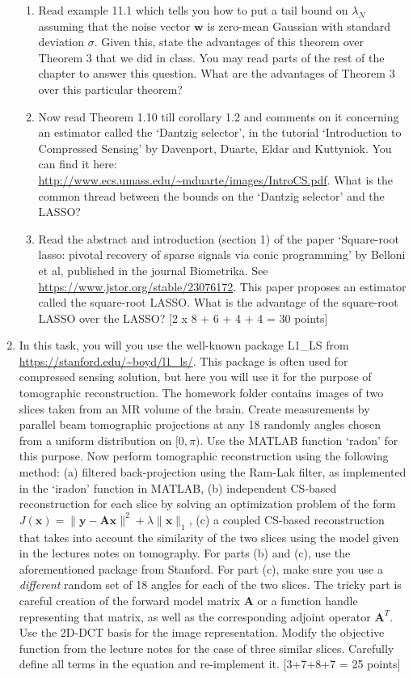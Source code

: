 \documentclass[11pt]{article}
\begin{document}
\begin{enumerate}
\begin{enumerate}
\item Read example 11.1 which tells you how to put a tail bound on $\lambda_N$ assuming that the noise vector $\boldsymbol{w}$ is zero-mean Gaussian with standard  deviation $\sigma$. Given this, state the advantages of this theorem over Theorem 3 that we did in class. You may read parts of the rest of the chapter to answer this question. What are the advantages of Theorem 3 over this particular theorem? 
\item Now read Theorem 1.10 till corollary 1.2 and comments on it concerning an estimator called the `Dantzig selector', in the tutorial `Introduction to Compressed Sensing' by Davenport, Duarte, Eldar and Kuttyniok. You can find it here: \url{http://www.ecs.umass.edu/~mduarte/images/IntroCS.pdf}. What is the common thread between the bounds on the `Dantzig selector' and the LASSO? 
\item Read the abstract and introduction (section 1) of the paper `Square-root lasso: pivotal recovery of sparse signals via conic programming' by Belloni et al, published in the journal Biometrika. See \url{https://www.jstor.org/stable/23076172}. This paper proposes an estimator called the square-root LASSO. What is the advantage of the square-root LASSO over the LASSO?
\textsf{[2 x 8 + 6 + 4 + 4 = 30 points]}
\end{enumerate}

\item In this task, you will you use the well-known package L1\_LS from \url{https://stanford.edu/~boyd/l1_ls/}. This package is often used for compressed sensing solution, but here you will use it for the purpose of tomographic reconstruction. The homework folder contains images of two slices taken from an MR volume of the brain. Create measurements by parallel beam tomographic projections at any 18 randomly angles chosen from a uniform distribution on $[0,\pi)$. Use the MATLAB function `radon' for this purpose. Now perform tomographic reconstruction using the following method: (a) filtered back-projection using the Ram-Lak filter, as implemented in the `iradon' function in MATLAB, (b) independent CS-based reconstruction for each slice by solving an optimization problem of the form $J(\boldsymbol{x}) = \|\boldsymbol{y}-\boldsymbol{Ax}\|^2 + \lambda \|\boldsymbol{x}\|_1$, (c) a coupled CS-based reconstruction that takes into account the similarity of the two slices using the model given in the lectures notes on tomography. For parts (b) and (c), use the aforementioned package from Stanford. For part (c), make sure you use a \emph{different} random set of 18 angles for each of the two slices. The tricky part is careful creation of the forward model matrix $\boldsymbol{A}$ or a function handle representing that matrix, as well as the corresponding adjoint operator $\boldsymbol{A}^T$. Use the 2D-DCT basis for the image representation. 
Modify the objective function from the lecture notes for the case of three similar slices. Carefully define all terms in the equation and re-implement it. \textsf{[3+7+8+7 = 25 points]}


\end{enumerate}
\end{document}
